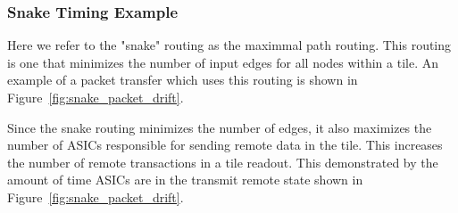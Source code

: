 \subsubsection{Snake Timing Example}

Here we refer to the "snake" routing as the maximmal path routing.
This routing is one that minimizes the number of input edges for all nodes within a tile.
An example of a packet transfer which uses this routing is shown in Figure~\ref{fig:snake_packet_drift}.

Since the snake routing minimizes the number of edges, it also maximizes the number of ASICs responsible for sending remote data in the tile.
This increases the number of remote transactions in a tile readout.
This demonstrated by the amount of time ASICs are in the transmit remote state shown in Figure~\ref{fig:snake_packet_drift}.

